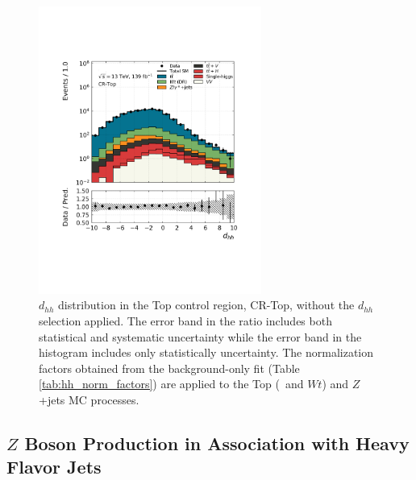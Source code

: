 \begin{figure}[!htb]
    \centering
    \includegraphics[width=0.65\textwidth]{figures/search_hh/bkg_estimate/crvr/crtop/crtoptest_NN_d_hh_fullsys}
    \caption{
        $d_{hh}$ distribution in the Top control region, CR-Top, without the $d_{hh}$ selection applied.
        The error band in the ratio includes both statistical and systematic uncertainty while
        the error band in the histogram includes only statistically uncertainty.
        The normalization factors obtained from the background-only fit (Table \ref{tab:hh_norm_factors}) are applied
        to the Top (\ttbar~and $Wt$) and $Z$+jets MC processes.
    }
    \label{fig:crtop_nm1_dhh}
\end{figure}

%
%

\FloatBarrier
\subsection{$Z$ Boson Production in Association with Heavy Flavor Jets}
\label{sec:cr_zhf}

